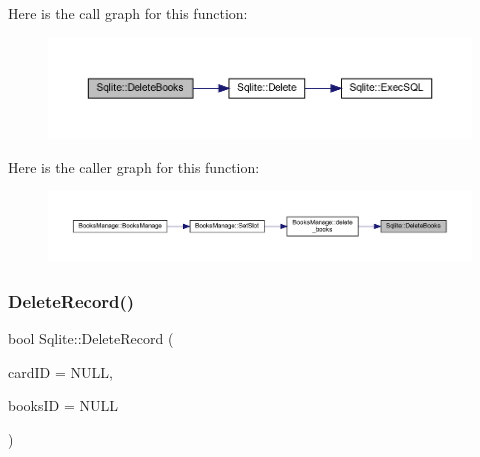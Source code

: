 Here is the call graph for this function\+:
\nopagebreak
\begin{figure}[H]
\begin{center}
\leavevmode
\includegraphics[width=350pt]{class_sqlite_a8a83c22e036086edf84758fb0f6cfc56_cgraph}
\end{center}
\end{figure}
Here is the caller graph for this function\+:
\nopagebreak
\begin{figure}[H]
\begin{center}
\leavevmode
\includegraphics[width=350pt]{class_sqlite_a8a83c22e036086edf84758fb0f6cfc56_icgraph}
\end{center}
\end{figure}
\mbox{\label{class_sqlite_aa120de86db20f42a61a5c2eae9ad6b89}} 
\subsubsection{\texorpdfstring{DeleteRecord()}{DeleteRecord()}}
{\footnotesize\ttfamily bool Sqlite\+::\+Delete\+Record (\begin{DoxyParamCaption}\item[{Q\+String}]{card\+ID = {\ttfamily NULL},  }\item[{Q\+String}]{books\+ID = {\ttfamily NULL} }\end{DoxyParamCaption})}

